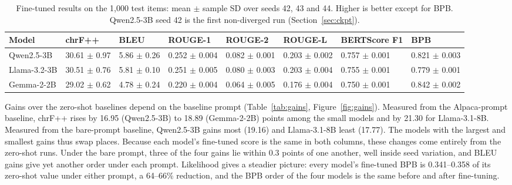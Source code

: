 \documentclass{article}
\begin{document}
\begin{table}[tbp]
\centering
\fontsize{8.5}{10}\selectfont
\setlength{\tabcolsep}{3pt}
\caption{Fine-tuned results on the 1,000 test items: mean $\pm$ sample SD over seeds 42, 43 and 44. Higher is better except for BPB. Qwen2.5-3B seed 42 is the first non-diverged run (Section~\ref{sec:ckpt}).}\label{tab:ft}
\begin{tabular}{@{}L{58.4pt}R{49.6pt}R{45.1pt}R{53.7pt}R{53.7pt}R{53.7pt}R{53.7pt}R{53.7pt}@{}}
\toprule
\textbf{Model} & \textbf{chrF++} & \textbf{BLEU} & \textbf{ROUGE-1} & \textbf{ROUGE-2} & \textbf{ROUGE-L} & \textbf{BERTScore F1} & \textbf{BPB} \\
\midrule
Qwen2.5-3B & 30.61 $\pm$ 0.97 & 5.86 $\pm$ 0.26 & 0.252 $\pm$ 0.004 & 0.082 $\pm$ 0.001 & 0.203 $\pm$ 0.002 & 0.757 $\pm$ 0.001 & 0.821 $\pm$ 0.003 \\
Llama-3.2-3B & 30.51 $\pm$ 0.76 & 5.81 $\pm$ 0.10 & 0.251 $\pm$ 0.005 & 0.080 $\pm$ 0.003 & 0.203 $\pm$ 0.004 & 0.755 $\pm$ 0.001 & 0.779 $\pm$ 0.001 \\
Gemma-2-2B & 29.02 $\pm$ 0.62 & 4.78 $\pm$ 0.24 & 0.220 $\pm$ 0.004 & 0.064 $\pm$ 0.005 & 0.176 $\pm$ 0.004 & 0.750 $\pm$ 0.001 & 0.842 $\pm$ 0.002 \\
\bottomrule
\end{tabular}
\end{table}

Gains over the zero-shot baselines depend on the baseline prompt (Table~\ref{tab:gains}, Figure~\ref{fig:gains}). Measured from the Alpaca-prompt baseline, chrF++ rises by 16.95 (Qwen2.5-3B) to 18.89 (Gemma-2-2B) points among the small models and by 21.30 for Llama-3.1-8B. Measured from the bare-prompt baseline, Qwen2.5-3B gains most (19.16) and Llama-3.1-8B least (17.77). The models with the largest and smallest gains thus swap places. Because each model's fine-tuned score is the same in both columns, these changes come entirely from the zero-shot runs. Under the bare prompt, three of the four gains lie within 0.3 points of one another, well inside seed variation, and BLEU gains give yet another order under each prompt. Likelihood gives a steadier picture: every model's fine-tuned BPB is 0.341–0.358 of its zero-shot value under either prompt, a 64–66\% reduction, and the BPB order of the four models is the same before and after fine-tuning.
\end{document}
